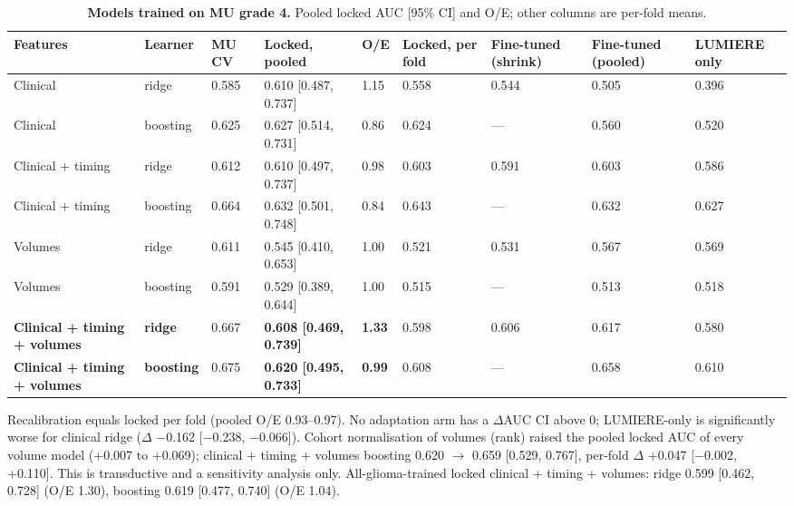 \documentclass[11pt,a4paper]{article}
\begin{document}
\begin{landscape}
\begin{table}[H]
\centering
\small
\renewcommand{\thetable}{S19}\renewcommand{\theHtable}{S19}
\caption{\textbf{Models trained on MU grade 4.} Pooled locked AUC [95\% CI] and O/E; other columns are per-fold means.}
\label{tab:S19}
\begin{tabularx}{\linewidth}{@{}L R{1.6cm} R{1.2cm} R{3.4cm} R{1.0cm} R{1.5cm} R{1.6cm} R{1.6cm} R{1.6cm}@{}}
\toprule
Features & Learner & MU CV & Locked, pooled & O/E & Locked, per fold & Fine-tuned (shrink) & Fine-tuned (pooled) & LUMIERE only \\
\midrule
Clinical & ridge & 0.585 & 0.610 [0.487, 0.737] & 1.15 & 0.558 & 0.544 & 0.505 & 0.396 \\
Clinical & boosting & 0.625 & 0.627 [0.514, 0.731] & 0.86 & 0.624 & --- & 0.560 & 0.520 \\
Clinical + timing & ridge & 0.612 & 0.610 [0.497, 0.737] & 0.98 & 0.603 & 0.591 & 0.603 & 0.586 \\
Clinical + timing & boosting & 0.664 & 0.632 [0.501, 0.748] & 0.84 & 0.643 & --- & 0.632 & 0.627 \\
Volumes & ridge & 0.611 & 0.545 [0.410, 0.653] & 1.00 & 0.521 & 0.531 & 0.567 & 0.569 \\
Volumes & boosting & 0.591 & 0.529 [0.389, 0.644] & 1.00 & 0.515 & --- & 0.513 & 0.518 \\
\textbf{Clinical + timing + volumes} & \textbf{ridge} & 0.667 & \textbf{0.608 [0.469, 0.739]} & \textbf{1.33} & 0.598 & 0.606 & 0.617 & 0.580 \\
\textbf{Clinical + timing + volumes} & \textbf{boosting} & 0.675 & \textbf{0.620 [0.495, 0.733]} & \textbf{0.99} & 0.608 & --- & 0.658 & 0.610 \\
\bottomrule
\end{tabularx}
\end{table}
\end{landscape}

Recalibration equals locked per fold (pooled O/E 0.93--0.97). No adaptation arm has a $\Delta$AUC CI above 0;
LUMIERE-only is significantly worse for clinical ridge ($\Delta$ $-$0.162 [$-$0.238, $-$0.066]). Cohort
normalisation of volumes (rank) raised the pooled locked AUC of every volume model (+0.007 to +0.069);
clinical + timing + volumes boosting 0.620 $\rightarrow$ 0.659 [0.529, 0.767], per-fold $\Delta$ +0.047
[$-$0.002, +0.110]. This is transductive and a sensitivity analysis only. All-glioma-trained locked clinical +
timing + volumes: ridge 0.599 [0.462, 0.728] (O/E 1.30), boosting 0.619 [0.477, 0.740] (O/E 1.04).
\end{document}
